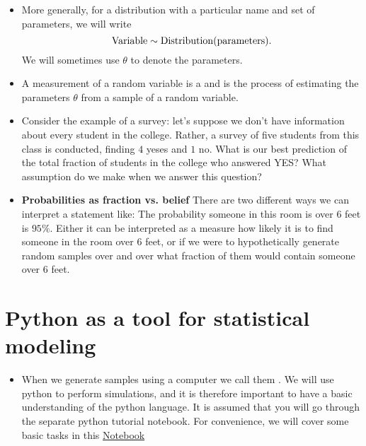 \begin{itemize}
\begin{example}
\end{example}


\item  More generally, for a distribution with a particular name and set of parameters, we will write 
\begin{equation*}
{\rm Variable} \sim {\rm Distribution}({\rm parameters}).
\end{equation*}
We will sometimes use $\theta$ to denote the parameters. 
\item A measurement of a random variable is a  and   is the process of estimating the parameters $\theta$ from a sample of a random variable. 
\item Consider the example of a survey: let's suppose we don't have information about every student in the college. Rather, a survey of five students from this class is conducted, finding $4$ yeses and $1$ no. What is our best prediction of the total fraction of students in the college who answered YES? What assumption do we make when we answer this question? 
\item {\bf Probabilities as fraction vs. belief}
There are two different ways we can interpret a statement like: The probability someone in this room is over $6$ feet is $95\%$. Either it can be interpreted as a measure how likely it is to find someone in the room over $6$ feet, or if we were to hypothetically generate random samples over and over what fraction of them would contain someone over $6$ feet. 
\end{itemize}





\section{Python as a tool for statistical modeling}
\begin{itemize}
\item When we generate samples using a computer we call them . We will use python to perform simulations, and it is therefore important to have a basic understanding of the python language. It is assumed that you will go through the separate python tutorial notebook. For convenience, we will cover some basic tasks in this \href{https://colab.research.google.com/drive/1Gs-gSsUP1hHVwhrbwvWzLVm1ulcLJKRI#scrollTo=_c4br6SCUtUy}{Notebook}
\end{itemize}

